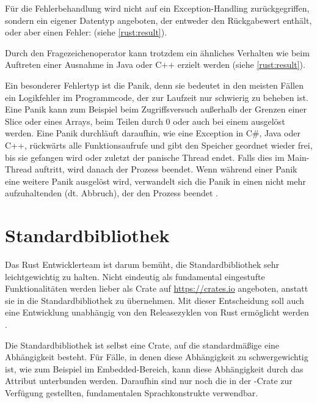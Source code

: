 Für die Fehlerbehandlung wird nicht auf ein Exception-Handling zurückgegriffen, sondern ein eigener Datentyp angeboten, der entweder den Rückgabewert enthält, oder aber einen Fehler:  (siehe \autoref{rust:result}).

Durch den Fragezeichenoperator kann trotzdem ein ähnliches Verhalten wie beim Auftreten einer Ausnahme in Java oder C++ erzielt werden (siehe \autoref{rust:result}).

\label{rust:panic}
Ein besonderer Fehlertyp ist die Panik, denn sie bedeutet in den meisten Fällen ein Logikfehler im Programmcode, der zur Laufzeit nur schwierig zu beheben ist.
Eine Panik kann zum Beispiel beim Zugriffsversuch außerhalb der Grenzen einer Slice oder eines Arrays, beim Teilen durch 0 oder auch bei einem  ausgelöst werden.
Eine Panik durchläuft daraufhin, wie eine Exception in C\#, Java oder C++, rückwärts alle Funktionsaufrufe und gibt den Speicher geordnet wieder frei, bis sie gefangen wird oder zuletzt der panische Thread endet.
Falls dies im Main-Thread auftritt, wird danach der Prozess beendet.
Wenn während einer Panik eine weitere Panik ausgelöst wird, verwandelt sich die Panik in einen nicht mehr aufzuhaltenden  (dt. Abbruch), der den Prozess beendet \cite[145-147]{rust:orly_programming}.




\section{Standardbibliothek}
\label{rust:stdlib}

Das Rust Entwicklerteam ist darum bemüht, die Standardbibliothek sehr leichtgewichtig zu halten.
Nicht eindeutig als fundamental eingestufte Funktionalitäten werden lieber als Crate auf \url{https://crates.io} angeboten, anstatt sie in die Standardbibliothek zu übernehmen. 
Mit dieser Entscheidung soll auch eine Entwicklung unabhängig von den Releasezyklen von Rust ermöglicht werden \cite{rust:internals:1242}.

Die Standardbibliothek ist selbst eine Crate, auf die standardmäßige eine Abhängigkeit besteht.
Für Fälle, in denen diese Abhängigkeit zu schwergewichtig ist, wie zum Beispiel im Embedded-Bereich, kann diese Abhängigkeit durch das Attribut \rustcinline{#![no_std]} unterbunden werden.
Daraufhin sind nur noch die in der -Crate zur Verfügung gestellten, fundamentalen Sprachkonstrukte verwendbar.

